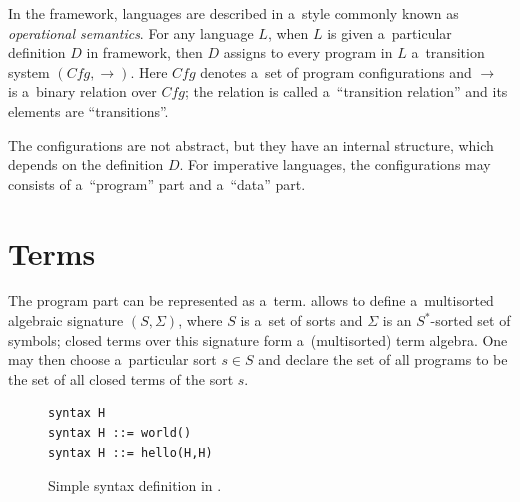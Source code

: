 \documentclass[nolot,nolof,nocover,printed]{fithesis3}
\newcommand{\var}[1]{\mathit{#1}\xspace}
\begin{document}


In the \K framework, languages are described in a~style commonly known as \textit{operational semantics}. For any language $\var{L}$, when $\var{L}$ is given a~particular definition $\var{D}$ in \K framework, then $\var{D}$ assigns to every program in $\var{L}$ a~transition system $( \var{Cfg}, \rightarrow )$. Here $\var{Cfg}$ denotes a~set of program configurations and $\rightarrow$ is a~binary relation over $\var{Cfg}$; the relation is called a~\enquote{transition relation} and its elements are \enquote{transitions}. %


The configurations are not abstract, but they have an internal structure, which depends on the definition $\var{D}$. For imperative languages, the configurations may consists of a~\enquote{program} part and a~\enquote{data} part.

\section{Terms}

The program part can be represented as a~term. \K allows to define a~multisorted algebraic signature $(S, \Sigma)$, where $S$ is a~set of sorts and $\Sigma$ is an $S^*$-sorted set of symbols; closed terms over this signature form a~(multisorted) term algebra. One may then choose a~particular sort $s \in S$ and declare the set of all programs to be the set of all closed terms of the sort $s$.

\begin{figure}[t]
\begin{lstlisting}
syntax H
syntax H ::= world()
syntax H ::= hello(H,H)
\end{lstlisting}
\caption{Simple syntax definition in \K.}
\label{fig:helloSorts}
\end{figure}
\end{document}
